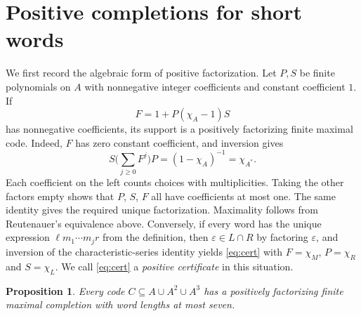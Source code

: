\documentclass[11pt,a4paper]{article}
\newtheorem{proposition}[theorem]{Proposition}
\newcommand{\eps}{\varepsilon}
\begin{document}
\section{Positive completions for short words}

We first record the algebraic form of positive factorization. Let $P,S$ be finite polynomials on
$A$ with nonnegative integer coefficients and constant coefficient $1$. If
\begin{equation}\label{eq:cert}
  F=1+P(\chi_A-1)S
\end{equation}
has nonnegative coefficients, its support is a positively factorizing finite maximal code.
Indeed, $F$ has zero constant coefficient, and inversion gives
\[
  S\Big(\sum_{j\ge0}F^j\Big)P=(1-\chi_A)^{-1}=\chi_{A^*}.
\]
Each coefficient on the left counts choices with multiplicities. Taking the other factors empty
shows that $P$, $S$, $F$ all have coefficients at most one. The same identity gives the required
unique factorization. Maximality follows from Reutenauer's equivalence above. Conversely, if every
word has the unique expression $\ell m_1\cdots m_jr$ from the definition, then $\eps\in L\cap R$ by
factoring $\eps$, and inversion of the characteristic-series identity yields \eqref{eq:cert} with
$F=\chi_M$, $P=\chi_R$ and $S=\chi_L$. We call \eqref{eq:cert} a \emph{positive certificate} in
this situation.

\begin{proposition}\label{prop:short}
Every code $C\subseteq A\cup A^2\cup A^3$ has a positively factorizing finite maximal completion
with word lengths at most seven.
\end{proposition}
\end{document}
